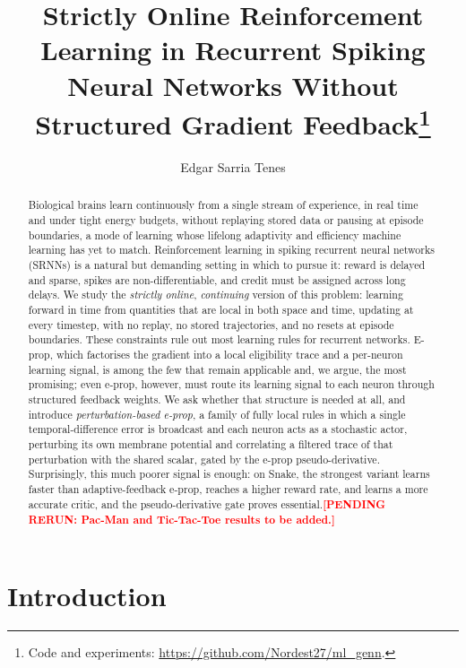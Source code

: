 \documentclass[10pt,twocolumn]{article}
\title{\sffamily\bfseries Strictly Online Reinforcement Learning in Recurrent Spiking
Neural Networks Without Structured Gradient Feedback\thanks{Code and experiments: \url{https://github.com/Nordest27/ml_genn}.}}
\author[1]{Edgar Sarria Tenes}
\affil[1]{Affiliation \\ \texttt{edgar.sarria@estudiantat.upc.edu}}
\date{}
\newcommand{\pending}[1]{\textcolor{red}{\bfseries[PENDING RERUN#1]}}
\newcommand{\method}{perturbation-based e-prop}   %
\begin{document}
\maketitle

\begin{abstract}
Biological brains learn continuously from a single stream of experience, in
real time and under tight energy budgets, without replaying stored data or
pausing at episode boundaries, a mode of learning whose lifelong adaptivity and
efficiency machine learning has yet to match. Reinforcement learning in spiking
recurrent neural networks (SRNNs) is a natural but demanding setting in which to
pursue it: reward is delayed and sparse, spikes are non-differentiable, and
credit must be assigned across long delays. We study the \emph{strictly online},
\emph{continuing} version of this problem: learning forward in time from
quantities that are local in both space and time, updating at every timestep,
with no replay, no stored trajectories, and no resets at episode boundaries.
These constraints rule out most learning rules for recurrent networks. E-prop,
which factorises the gradient into a local eligibility trace and a per-neuron
learning signal, is among the few that remain applicable and, we argue, the most
promising; even e-prop, however, must route its learning signal to each neuron
through structured feedback weights. We ask whether that structure is needed
at all, and introduce \emph{\method{}}, a family of fully local rules
in which a single temporal-difference error is broadcast and each neuron acts
as a stochastic actor, perturbing its own membrane potential and correlating a
filtered trace of that perturbation with the shared scalar, gated by the e-prop
pseudo-derivative. Surprisingly, this much poorer signal is enough: on Snake,
the strongest variant learns faster than adaptive-feedback e-prop, reaches a
higher reward rate, and learns a more accurate critic, and the pseudo-derivative
gate proves essential.\pending{: Pac-Man and Tic-Tac-Toe results to be added.}
\end{abstract}

\section{Introduction}
\label{sec:intro}
\end{document}
